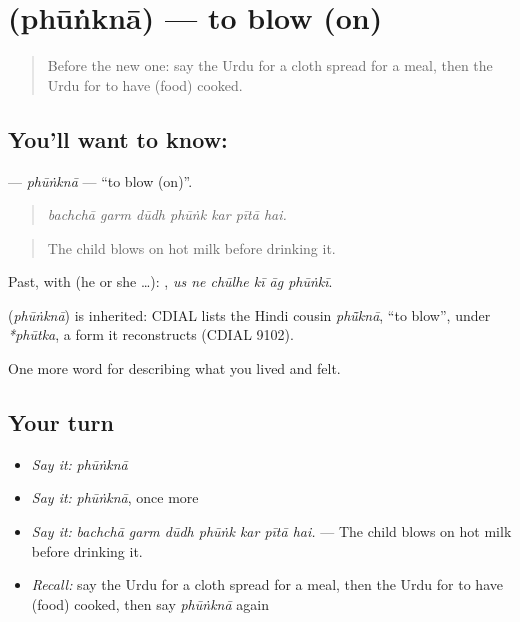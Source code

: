 \section[\texorpdfstring{\ur{پھونکنا} (phūṅknā)}{پھونکنا (phūṅknā)}]{ (phūṅknā) — to blow (on)}

\label{lesson:UR-C511-phunkna}



\begin{quote}
Before the new one: say the Urdu for a cloth spread for a meal, then the Urdu for to have (food) cooked.
\end{quote}

\subsection*{You'll want to know: }
\textbf{} — \emph{phūṅknā} — \textquotedblleft{}to blow (on)\textquotedblright{}.

\begin{quote}
      
\end{quote}

\begin{quote}
\emph{bachchā garm dūdh phūṅk kar pītā hai.}
\end{quote}

\begin{quote}
The child blows on hot milk before drinking it.
\end{quote}

Past, with  (he or she …):      , \emph{us ne chūlhe kī āg phūṅkī}.

\begin{cousinweb}
\textbf{} (\emph{phūṅknā}) is inherited: CDIAL lists the Hindi cousin \emph{phū̃knā}, \textquotedblleft{}to blow\textquotedblright{}, under \emph{*phūtka}, a form it reconstructs (CDIAL 9102).
\end{cousinweb}

\begin{grammarlens}[title={What you've built}]
One more word for describing what you lived and felt.
\end{grammarlens}

\subsection*{Your turn}
\begin{itemize}
\raggedright
  \item \emph{Say it:} \emph{phūṅknā}
  \item \emph{Say it:} \emph{phūṅknā}, once more
  \item \emph{Say it:} \emph{bachchā garm dūdh phūṅk kar pītā hai.} — The child blows on hot milk before drinking it.
  \item \emph{Recall:} say the Urdu for a cloth spread for a meal, then the Urdu for to have (food) cooked, then say \emph{phūṅknā} again
\end{itemize}

